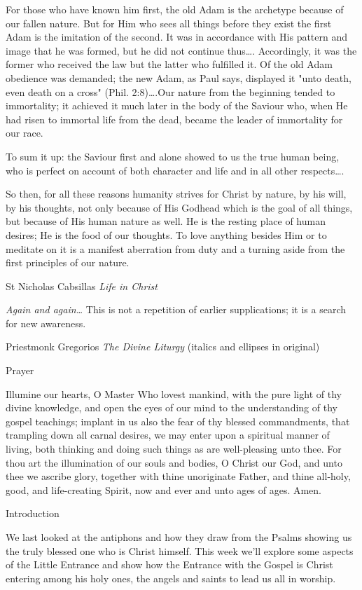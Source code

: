\documentclass[
]{article}
\begin{document}
For those who have known him first, the old Adam is the archetype
because of our fallen nature. But for Him who sees all things before
they exist the first Adam is the imitation of the second. It was in
accordance with His pattern and image that he was formed, but he did not
continue thus\ldots. Accordingly, it was the former who received the law
but the latter who fulfilled it. Of the old Adam obedience was demanded;
the new Adam, as Paul says, displayed it "unto death, even death on a
cross" (Phil. 2:8)\ldots.Our nature from the beginning tended to
immortality; it achieved it much later in the body of the Saviour who,
when He had risen to immortal life from the dead, became the leader of
immortality for our race.

To sum it up: the Saviour first and alone showed to us the true human
being, who is perfect on account of both character and life and in all
other respects\ldots.

So then, for all these reasons humanity strives for Christ by nature, by
his will, by his thoughts, not only because of His Godhead which is the
goal of all things, but because of His human nature as well. He is the
resting place of human desires; He is the food of our thoughts. To love
anything besides Him or to meditate on it is a manifest aberration from
duty and a turning aside from the first principles of our nature.

St Nicholas Cabsillas \emph{Life in Christ}

\emph{Again and again\ldots{}} This is not a repetition of earlier
supplications; it is a search for new awareness.

Priestmonk Gregorios \emph{The Divine Liturgy} (italics and ellipses in
original)

Prayer

Illumine our hearts, O Master Who lovest mankind, with the pure light of
thy divine knowledge, and open the eyes of our mind to the understanding
of thy gospel teachings; implant in us also the fear of thy blessed
commandments, that trampling down all carnal desires, we may enter upon
a spiritual manner of living, both thinking and doing such things as are
well-pleasing unto thee. For thou art the illumination of our souls and
bodies, O Christ our God, and unto thee we ascribe glory, together with
thine unoriginate Father, and thine all-holy, good, and life-creating
Spirit, now and ever and unto ages of ages. Amen.

Introduction

We last looked at the antiphons and how they draw from the Psalms
showing us the truly blessed one who is Christ himself. This week we'll
explore some aspects of the Little Entrance and show how the Entrance
with the Gospel is Christ entering among his holy ones, the angels and
saints to lead us all in worship.
\end{document}
